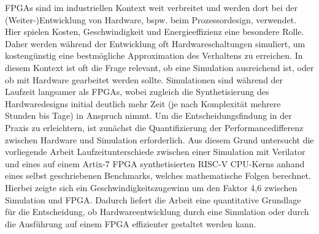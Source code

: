 \begin{center} 
    \huge {}
\end{center}


FPGAs sind im industriellen Kontext weit verbreitet und werden dort bei der (Weiter-)Entwicklung von Hardware, bspw. beim Prozessordesign, verwendet.
Hier spielen Kosten, Geschwindigkeit und Energieeffizienz eine besondere Rolle.
Daher werden während der Entwicklung oft Hardwareschaltungen simuliert, um kostengünstig eine bestmögliche Approximation des Verhaltens zu erreichen.
In diesem Kontext ist oft die Frage relevant, ob eine Simulation ausreichend ist, oder ob mit Hardware gearbeitet werden sollte.
Simulationen sind während der Laufzeit langsamer als FPGAs, wobei zugleich die Synthetisierung des Hardwaredesigns initial deutlich mehr Zeit (je nach Komplexität mehrere Stunden bis Tage) in Anspruch nimmt.
Um die Entscheidungsfindung in der Praxis zu erleichtern, ist zunächst die Quantifizierung der Performancedifferenz zwischen Hardware und Simulation erforderlich.
Aus diesem Grund untersucht die vorliegende Arbeit Laufzeitunterschiede zwischen einer Simulation mit Verilator und eines auf einem Artix-7 FPGA synthetisierten RISC-V CPU-Kerns anhand eines selbst geschriebenen Benchmarks, welches mathematische Folgen berechnet.
Hierbei zeigte sich ein Geschwindigkeitszugewinn um den Faktor 4,6 zwischen Simulation und FPGA.
Dadurch liefert die Arbeit eine quantitative Grundlage für die Entscheidung, ob Hardwareentwicklung durch eine Simulation oder durch die Ausführung auf einem FPGA effizienter gestaltet werden kann.